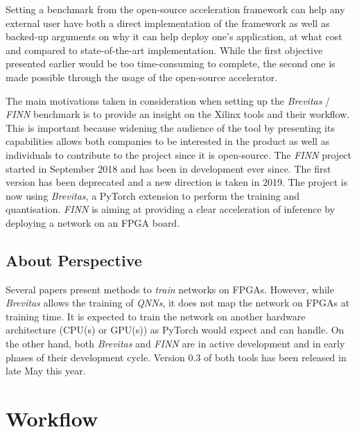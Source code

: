 Setting a benchmark from the open-source acceleration framework can help any external user have both a direct implementation of the framework as well as backed-up arguments on why it can help deploy one's application, at what cost and compared to state-of-the-art implementation. While the first objective presented earlier would be too time-consuming to complete, the second one is made possible through the usage of the open-source accelerator.

The main motivations taken in consideration when setting up the \emph{Brevitas} / \emph{FINN} benchmark is to provide an insight on the Xilinx tools and their workflow. This is important because widening the audience of the tool by presenting its capabilities allows both companies to be interested in the product as well as individuals to contribute to the project since it is open-source. The \emph{FINN} project started in September 2018 and has been in development ever since. The first version has been deprecated and a new direction is taken in 2019. The project is now using \emph{Brevitas}, a PyTorch extension to perform the training and quantisation. \emph{FINN} is aiming at providing a clear acceleration of inference by deploying a network on an FPGA board.


\subsection{About Perspective}

Several papers present methods to \emph{train} networks on FPGAs. However, while \emph{Brevitas} allows the training of \emph{QNNs}, it does not map the network on FPGAs at training time. It is expected to train the network on another hardware architecture (CPU(s) or GPU(s)) as PyTorch would expect and can handle. On the other hand, both \emph{Brevitas} and \emph{FINN} are in active development and in early phases of their development cycle. Version 0.3 of both tools has been released in late May this year.


\section{Workflow}

